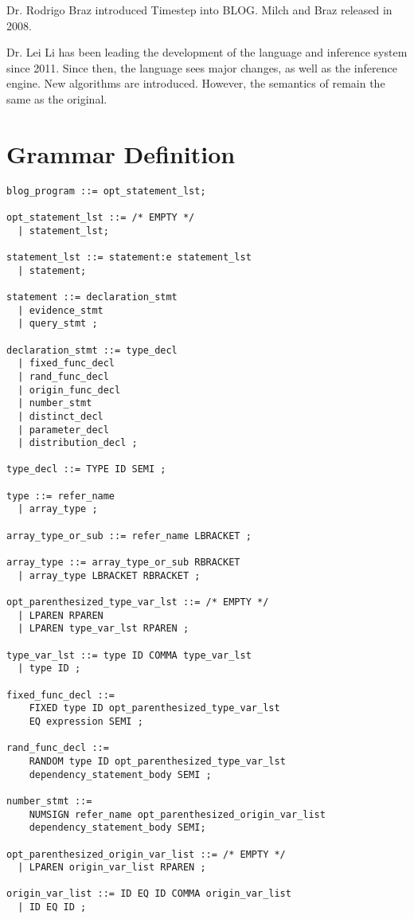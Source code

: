 \documentclass[12pt]{article}
\begin{document}
Dr. Rodrigo Braz introduced Timestep into BLOG. Milch and Braz released  in 2008.

Dr. Lei Li has been leading the development of the language and \bl inference system since 2011. Since then, the language sees major changes, as well as the inference engine. New algorithms are introduced. However, the semantics of \bl remain the same as the original. 

\section{\bl Grammar Definition}\label{bnf-appendix}

\begin{verbatim}
blog_program ::= opt_statement_lst;

opt_statement_lst ::= /* EMPTY */ 
  | statement_lst;

statement_lst ::= statement:e statement_lst
  | statement;

statement ::= declaration_stmt 
  | evidence_stmt 
  | query_stmt ;

declaration_stmt ::= type_decl
  | fixed_func_decl
  | rand_func_decl
  | origin_func_decl 
  | number_stmt 
  | distinct_decl 
  | parameter_decl 
  | distribution_decl ;

type_decl ::= TYPE ID SEMI ;

type ::= refer_name
  | array_type ;

array_type_or_sub ::= refer_name LBRACKET ;

array_type ::= array_type_or_sub RBRACKET
  | array_type LBRACKET RBRACKET ;

opt_parenthesized_type_var_lst ::= /* EMPTY */
  | LPAREN RPAREN
  | LPAREN type_var_lst RPAREN ;

type_var_lst ::= type ID COMMA type_var_lst
  | type ID ;

fixed_func_decl ::=
    FIXED type ID opt_parenthesized_type_var_lst 
    EQ expression SEMI ;

rand_func_decl ::=
    RANDOM type ID opt_parenthesized_type_var_lst 
    dependency_statement_body SEMI ;

number_stmt ::=
    NUMSIGN refer_name opt_parenthesized_origin_var_list
    dependency_statement_body SEMI;

opt_parenthesized_origin_var_list ::= /* EMPTY */
  | LPAREN origin_var_list RPAREN ;

origin_var_list ::= ID EQ ID COMMA origin_var_list
  | ID EQ ID ;


\end{verbatim}
\end{document}
